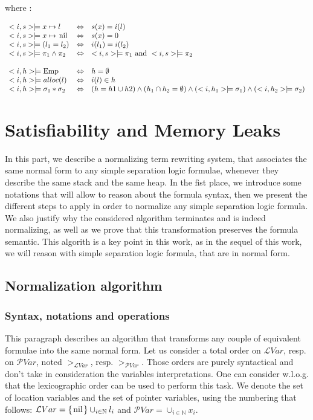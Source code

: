 \documentclass[a4paper,twoside,12pt]{report}
\newcommand\LVar{\mathcal{L}Var} %
\newcommand\PVar{\mathcal{P}Var} %
\newcommand{\gton}[1]{>_{#1}}
\newcommand{\gtlvar}[0]{\gton{\LVar}}
\newcommand{\gtptrvar}[0]{\gton{\PVar}}
\newcommand{\Alloc}[1]{alloc(#1)}
\newcommand{\Emp}{\lstinline{Emp}}
\newcommand{\Unsep}[0]{\ast}
\newcommand{\Sep}[2]{#1 \Unsep #2}
\newcommand{\EqLoc}[2]{ (#1 = #2) }
\newcommand{\Andpure}[2]{ #1 \wedge #2}
\newcommand{\Pointsto}[2]{ #1 \mapsto #2}
\newcommand{\nil}[0]{\lstinline!nil!}
\newcommand{\Pointstonil}[1]{ #1 \mapsto \mbox{\nil}}
\begin{document}
where :

$$
\begin{array}{lcl}
<i,s> \models \Pointsto{x}{l} &\Leftrightarrow & s(x)=i(l) \\
<i,s> \models \Pointstonil{x} &\Leftrightarrow & s(x)=0 \\
<i,s> \models \EqLoc{l_1}{l_2} &\Leftrightarrow &  i(l_1)=i(l_2) \\
<i,s> \models \Andpure{\pi_1}{\pi_2} &\Leftrightarrow & <i,s> \models \pi_1 \mbox{ and }  <i,s> \models \pi_2 \\
&&\\
<i,h>\models \Emp & \Leftrightarrow &  h=\emptyset \\
<i,h> \models \Alloc{l} & \Leftrightarrow &  i(l) \in h \\
<i,h> \models \Sep{\sigma_1}{\sigma_2}  & \Leftrightarrow & (h=h1 \cup h2) \wedge( h_1\cap h_2 = \emptyset)\wedge (<i,h_1>\models \sigma_1)\wedge(<i,h_2>\models \sigma_2) \\
\end{array}
$$


\chapter{Satisfiability and Memory Leaks}


In this part, we describe a normalizing term rewriting system, that associates
the same normal form to any simple separation logic formulae, whenever they describe the same stack and the same heap.
In the fist place, we introduce some notations that will allow to reason
about the formula syntax, then we present the different steps to apply in order to normalize any simple separation logic formula. We also justify why the considered algorithm terminates and is indeed normalizing, as well as we prove
that this transformation preserves the formula semantic.
This algorith is a key point in this work, as in the sequel of this work, we will reason with simple separation logic formula, that are in normal form.
 
\section{Normalization algorithm}

\subsection{Syntax, notations and operations}
This paragraph describes an algorithm that transforms any couple of equivalent
formulae into the same normal form. 
Let us consider a total order on $\LVar$, resp. on $\PVar$, noted $\gtlvar$, resp. $\gtptrvar$. Those orders are purely syntactical and don't take in consideration the variables interpretations. One can consider w.l.o.g. that the lexicographic order can be used to perform this task.
We denote the set of location variables and the set of pointer variables, using the numbering that follows: $\LVar=\lbrace \nil \rbrace \cup_{i\in\mathbb{N}} l_i$ and $\PVar=\cup_{i\in\mathbb{N}} x_i$.
\end{document}
